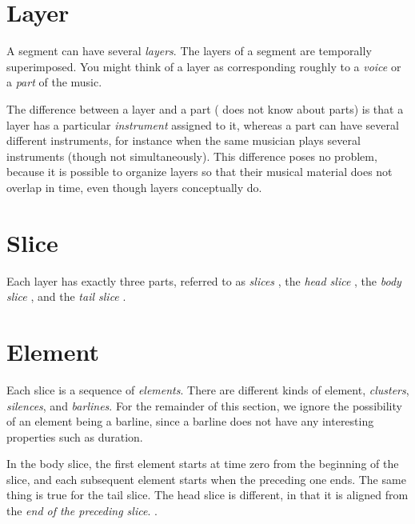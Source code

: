 \section{Layer}

A segment can have several \emph{layers}.  The layers of
a segment are temporally superimposed.  You might think of a layer as
corresponding roughly to a \emph{voice}  or a \emph{part}
 of the music.  

The difference between a layer and a part (\sysname{} does not know about
parts) is that a layer has a particular \emph{instrument}
 assigned to it, whereas a part can have several
different instruments, for instance when the same musician plays
several instruments (though not simultaneously).  This difference poses
no problem, because it is possible to organize \sysname{} layers so that
their musical material does not overlap in time, even though layers
conceptually do. 

\section{Slice}

Each layer has exactly three parts, referred to as \emph{slices}
, the \emph{head slice}
, the \emph{body slice}
, and the \emph{tail slice}
. 

\section{Element}

Each slice is a sequence of \emph{elements}.  There are
different kinds of element, \emph{clusters},
\emph{silences}, and \emph{barlines}.
For the remainder of this section, we ignore the possibility of
an element being a barline, since a barline does not have any
interesting properties such as duration.

In the body slice, the first element starts at time zero from the
beginning of the slice, and each subsequent element starts when the
preceding one ends.  The same thing is true for the tail
slice.  The head slice is
different, in that it is aligned from the \emph{end of the preceding
slice}.  .

